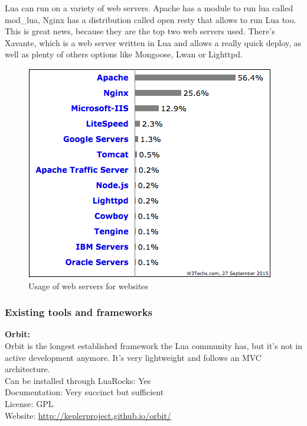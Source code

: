 \documentclass{article}
\begin{document}
Lua can run on a variety of web servers. Apache has a module to run lua called mod\_lua, Nginx has a distribution called open resty that allows to run Lua too. This is great news, because they are the top two web servers used\autocite{webservers}. There’s Xavante, which is a web server written in Lua and allows a really quick deploy, as well as plenty of others options like Mongoose, Lwan or Lighttpd. 
\begin{figure}[h]
\centering\includegraphics[scale=0.7]{webservers.png}
\caption{\label{fig:webservers} Usage of web servers for websites}
\end{figure}

\subsubsection{Existing tools and frameworks}

\textbf{Orbit:} \\

Orbit is the longest established framework the Lua community has, but it's not in active development anymore. It's very lightweight and follows an MVC architecture. \\

Can be installed through LuaRocks: Yes\\

Documentation: Very succinct but sufficient\\

License: GPL\\

Website: \url{http://keplerproject.github.io/orbit/}\\
\end{document}
